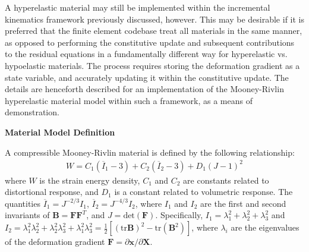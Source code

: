 A hyperelastic material may still be implemented within the incremental kinematics framework previously discussed, however. This may be desirable if it is preferred that the finite element codebase treat all materials in the same manner, as opposed to performing the constitutive update and subsequent contributions to the residual equations in a fundamentally different way for hyperelastic vs. hypoelastic materials. The process requires storing the deformation gradient as a state variable, and accurately updating it within the constitutive update. The details are henceforth described for an implementation of the Mooney-Rivlin hyperelastic material model within such a framework, as a means of demonstration.

\textbf{Material Model Definition}

A compressible Mooney-Rivlin material is defined by the following relationship:
\begin{align}
W = C_1(\overline{I}_1 - 3) + C_2(\overline{I}_2 - 3) + D_1(J - 1)^2
\end{align}
where $W$ is the strain energy density, $C_1$ and $C_2$ are constants related to distortional response, and $D_1$ is a constant related to volumetric response. The quantities $\overline{I}_1 = J^{-2/3}I_1$, $\overline{I}_2 = J^{-4/3}I_2$, where $I_1$ and $I_2$ are the first and second invariants of $\bm{B} = {\bm F}{\bm F}^T$, and $J = \text{det}({\bm F})$. Specifically, $I_1 = \lambda_1^2 + \lambda_2^2 + \lambda_3^2$ and $I_2 = \lambda_1^2\lambda_2^2 + \lambda_2^2\lambda_3^2 + \lambda_1^2\lambda_3^2 = \frac{1}{2}[(\text{tr}{\bm B})^2 - \text{tr}({\bm B}^2)]$, where $\lambda_i$ are the eigenvalues of the deformation gradient ${\bm F} = {\partial {\bm x}}/{\partial {\bm X}}$.


